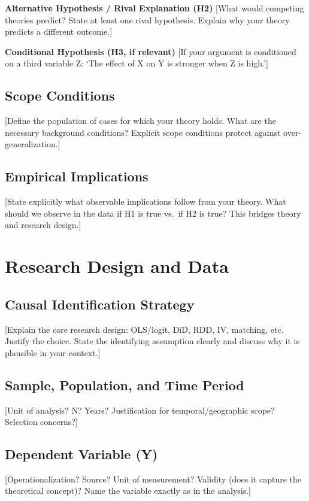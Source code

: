 \textbf{Alternative Hypothesis / Rival Explanation (H2)}
[What would competing theories predict? State at least one rival hypothesis. Explain why your theory predicts a different outcome.]

\textbf{Conditional Hypothesis (H3, if relevant)}
[If your argument is conditioned on a third variable Z: `The effect of X on Y is stronger when Z is high.']

\subsection{Scope Conditions} %
[Define the population of cases for which your theory holds. What are the necessary background conditions? Explicit scope conditions protect against over-generalization.]

\subsection{Empirical Implications} %
[State explicitly what observable implications follow from your theory. What should we observe in the data if H1 is true vs.\ if H2 is true? This bridges theory and research design.]

\section{Research Design and Data}\label{sec:design} %

\subsection{Causal Identification Strategy} %
[Explain the core research design: OLS/logit, DiD, RDD, IV, matching, etc. Justify the choice. State the identifying assumption clearly and discuss why it is plausible in your context.]

\subsection{Sample, Population, and Time Period} %
[Unit of analysis? N? Years? Justification for temporal/geographic scope? Selection concerns?]

\subsection{Dependent Variable (Y)} %
[Operationalization? Source? Unit of measurement? Validity (does it capture the theoretical concept)? Name the variable exactly as in the analysis.]


